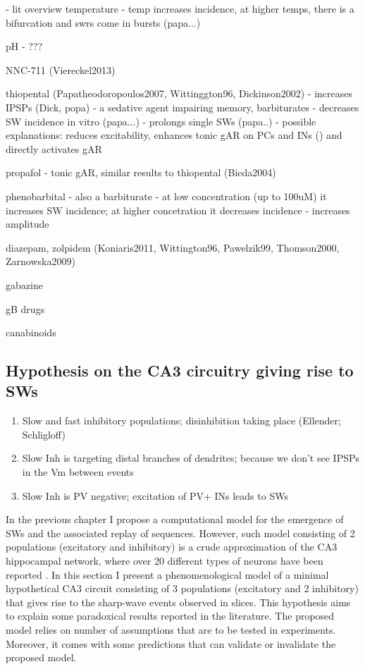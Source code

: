     - lit overview
    temperature
    - temp increases incidence, at higher temps, there is a bifurcation and swrs come in bursts (papa...)

pH
  - ???

NNC-711 (Viereckel2013)

thiopental (Papatheodoropoulos2007, Wittinggton96, Dickinson2002)
  - increases IPSPs (Dick, popa)
  - a sedative agent impairing memory, barbiturates
  - decreases SW incidence in vitro (papa...)
  - prolongs single SWs (papa..)
  - possible explanations: reduces excitability, enhances tonic gAR on PCs and INs () and directly activates gAR

propafol
  - tonic gAR, similar results to thiopental (Bieda2004)

phenobarbital
  - also a barbiturate
  - at low concentration (up to 100uM) it increases SW incidence; at higher concetration it decreases incidence
  - increases amplitude 

diazepam, zolpidem (Koniaris2011, Wittington96, Pawelzik99, Thomson2000, Zarnowska2009)

gabazine

gB drugs

canabinoids





  \subsection{Hypothesis on the CA3 circuitry giving rise to SWs}

    \begin{enumerate}
      \item Slow and fast inhibitory populations; disinhibition taking place (Ellender; Schligloff)
      \item Slow Inh is targeting distal branches of dendrites; because we don't see IPSPs in the Vm between events
      \item Slow Inh is PV negative; excitation of PV+ INs leads to SWs
    \end{enumerate}

    In the previous chapter I propose a computational model for the emergence
    of SWs and the associated replay of sequences. However, such model
    consisting of 2 populations (excitatory and inhibitory) is a crude
    approximation of the CA3 hippocampal network, where over 20 different types
    of neurons have been reported \citep{Maccaferri2003, Klausberger2008}. In
    this section I present a phenomenological model of a minimal hypothetical
    CA3 circuit consisting of 3 populations (excitatory and 2 inhibitory) that
    gives rise to the sharp-wave events observed in slices. This hypothesis
    aims to explain some paradoxical results reported in the literature. The
    proposed model relies on number of assumptions that are to be tested in
    experiments. Moreover, it comes with some predictions that can validate or
    invalidate the proposed model.

